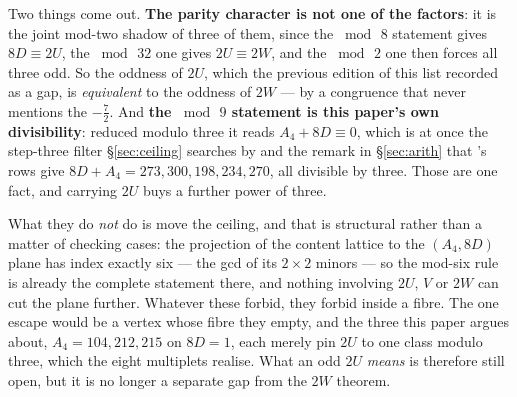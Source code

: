 \documentclass[11pt,a4paper]{article}
\begin{document}
\begin{itemize}
Two things come out. \textbf{The parity character is not one of the factors}: it is the joint
mod-two shadow of three of them, since the $\bmod\,8$ statement gives $8D\equiv2U$, the $\bmod\,32$
one gives $2U\equiv2W$, and the $\bmod\,2$ one then forces all three odd. So the oddness of $2U$,
which the previous edition of this list recorded as a gap, is \emph{equivalent} to the oddness of
$2W$ --- by a congruence that never mentions the $-\tfrac72$. And \textbf{the $\bmod\,9$ statement
is this paper's own divisibility}: reduced modulo three it reads $A_4+8D\equiv0$, which is at once
the step-three filter \S\ref{sec:ceiling} searches by and the remark in \S\ref{sec:arith} that
\cite{KM25}'s rows give $8D+A_4=273,300,198,234,270$, all divisible by three. Those are one fact,
and carrying $2U$ buys a further power of three.

What they do \emph{not} do is move the ceiling, and that is structural rather than a matter of
checking cases: the projection of the content lattice to the $(A_4,8D)$ plane has index exactly six
--- the gcd of its $2\times2$ minors --- so the mod-six rule is already the complete statement
there, and nothing involving $2U$, $V$ or $2W$ can cut the plane further. Whatever these forbid,
they forbid inside a fibre. The one escape would be a vertex whose fibre they empty, and the three
this paper argues about, $A_4=104,212,215$ on $8D=1$, each merely pin $2U$ to one class modulo
three, which the eight multiplets realise. What an odd $2U$ \emph{means} is therefore still open,
but it is no longer a separate gap from the $2W$ theorem.


\end{itemize}
\end{document}
